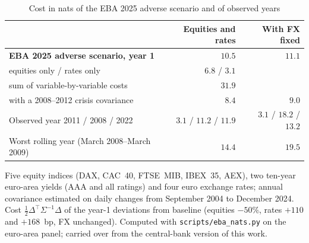 \begin{table}[p]\centering\small
\caption{Cost in nats of the EBA 2025 adverse scenario and of observed years}\label{tab:eba}
\begin{tabular}{@{}lrr@{}}\toprule
& Equities and rates & With FX fixed \\\midrule
\textbf{EBA 2025 adverse scenario, year 1} & $\mathbf{10.5}$ & $\mathbf{11.1}$ \\
\quad equities only / rates only & $6.8$ / $3.1$ & \\
\quad sum of variable-by-variable costs & $31.9$ & \\
\quad with a 2008--2012 crisis covariance & $8.4$ & $9.0$ \\\midrule
Observed year 2011 / 2008 / 2022 & $3.1$ / $11.2$ / $11.9$ & $3.1$ / $18.2$ / $13.2$ \\
Worst rolling year (March 2008--March 2009) & $14.4$ & $19.5$ \\
\bottomrule\end{tabular}
\par\medskip\begin{minipage}{0.95\linewidth}\footnotesize
Five equity indices (DAX, CAC~40, FTSE~MIB, IBEX~35, AEX), two ten-year euro-area yields (AAA and all ratings) and four euro
exchange rates; annual covariance estimated on daily changes from September 2004 to December 2024. Cost
$\frac12\Delta^\top\Sigma^{-1}\Delta$ of the year-1 deviations from baseline (equities $-50\%$, rates $+110$ and $+168$~bp,
FX unchanged). Computed with \texttt{scripts/eba\_nats.py} on the euro-area panel; carried over from the
central-bank version of this work.
\end{minipage}
\end{table}

